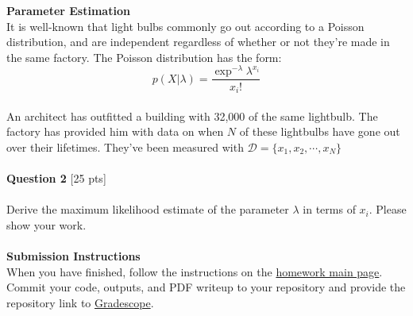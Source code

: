 \documentclass[paper=a4, fontsize=11pt]{scrartcl} %
\begin{document}
{\huge \textbf{Parameter Estimation}} \\

It is well-known that light bulbs commonly go out according to a Poisson distribution, and are independent regardless of whether or not they're made in the same factory. The Poisson distribution has the form: \\
\begin{equation}
p(X | \lambda) = \frac{ \exp^{-\lambda} \lambda ^{x_i}}{ x_i !} \nonumber
\end{equation} \\

An architect has outfitted a building with 32,000 of the same lightbulb. The factory has provided him with data on when $N$ of these lightbulbs have gone out over their lifetimes. They've been measured with $\mathcal{D} = \{ x_1, x_2, \cdots, x_N \}$\\
\\
{\Large \textbf{Question 2} [25 pts]} \\
\\
Derive the maximum likelihood estimate of the parameter $\lambda$ in terms of $x_i$. Please show your work. \\
\\


{\huge \textbf{Submission Instructions}} \\

When you have finished, follow the instructions on the \href{https://course.ccs.neu.edu/cs6220/homework-3/}{ homework main page}. Commit your code, outputs, and PDF writeup to your repository and provide the repository link to \href{https://www.gradescope.com}{Gradescope}.
\end{document}
